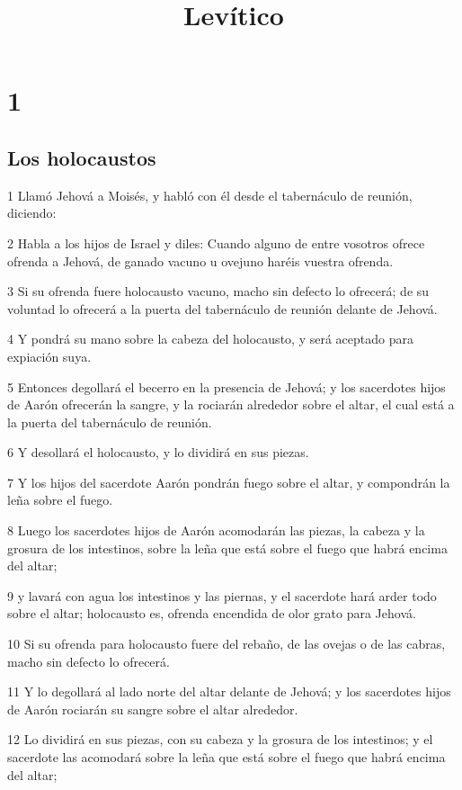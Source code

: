

\title{Levítico}

\chapter{1}

\section*{Los holocaustos}

\par 1 Llamó Jehová a Moisés, y habló con él desde el tabernáculo de reunión, diciendo:
\par 2 Habla a los hijos de Israel y diles: Cuando alguno de entre vosotros ofrece ofrenda a Jehová, de ganado vacuno u ovejuno haréis vuestra ofrenda.
\par 3 Si su ofrenda fuere holocausto vacuno, macho sin defecto lo ofrecerá; de su voluntad lo ofrecerá a la puerta del tabernáculo de reunión delante de Jehová.
\par 4 Y pondrá su mano sobre la cabeza del holocausto, y será aceptado para expiación suya.
\par 5 Entonces degollará el becerro en la presencia de Jehová; y los sacerdotes hijos de Aarón ofrecerán la sangre, y la rociarán alrededor sobre el altar, el cual está a la puerta del tabernáculo de reunión.
\par 6 Y desollará el holocausto, y lo dividirá en sus piezas.
\par 7 Y los hijos del sacerdote Aarón pondrán fuego sobre el altar, y compondrán la leña sobre el fuego.
\par 8 Luego los sacerdotes hijos de Aarón acomodarán las piezas, la cabeza y la grosura de los intestinos, sobre la leña que está sobre el fuego que habrá encima del altar;
\par 9 y lavará con agua los intestinos y las piernas, y el sacerdote hará arder todo sobre el altar; holocausto es, ofrenda encendida de olor grato para Jehová.
\par 10 Si su ofrenda para holocausto fuere del rebaño, de las ovejas o de las cabras, macho sin defecto lo ofrecerá.
\par 11 Y lo degollará al lado norte del altar delante de Jehová; y los sacerdotes hijos de Aarón rociarán su sangre sobre el altar alrededor.
\par 12 Lo dividirá en sus piezas, con su cabeza y la grosura de los intestinos; y el sacerdote las acomodará sobre la leña que está sobre el fuego que habrá encima del altar;
